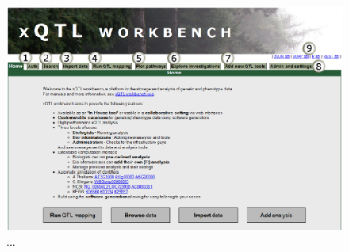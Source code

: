 \begin{figure}[h!]
  \centering
  \includegraphics[width=1.0\textwidth]{eps/image_4_5.eps}
  \caption[CisTrans plot.]
    {...}
\end{figure}

